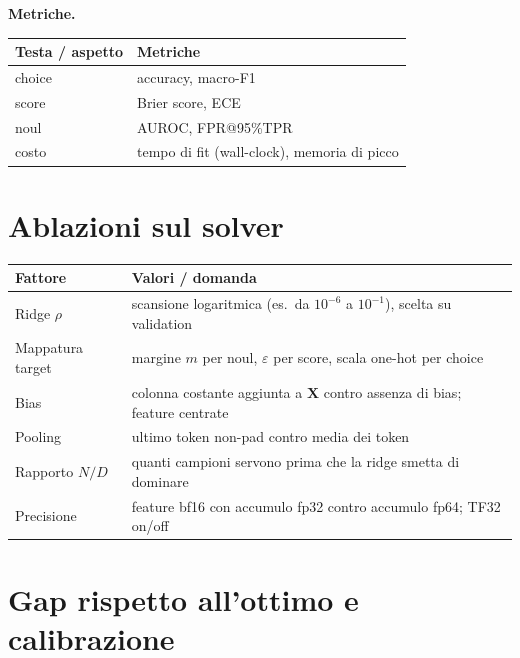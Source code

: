 \documentclass[11pt,a4paper]{article}
\newcommand{\X}{\bm{X}}
\begin{document}
\textbf{Metriche.}
\begin{center}
\begin{tabularx}{\textwidth}{lL}
\toprule
\textbf{Testa / aspetto} & \textbf{Metriche} \\
\midrule
choice & accuracy, macro-F1 \\
score  & Brier score, ECE \\
noul   & AUROC, FPR@95\%TPR \\
costo  & tempo di fit (wall-clock), memoria di picco \\
\bottomrule
\end{tabularx}
\end{center}

\section{Ablazioni sul solver}

\begin{center}
\begin{tabularx}{\textwidth}{lL}
\toprule
\textbf{Fattore} & \textbf{Valori / domanda} \\
\midrule
Ridge $\rho$ & scansione logaritmica (es.\ da $10^{-6}$ a $10^{-1}$), scelta su validation \\
Mappatura target & margine $m$ per noul, $\varepsilon$ per score, scala one-hot per choice \\
Bias & colonna costante aggiunta a $\X$ contro assenza di bias; feature centrate \\
Pooling & ultimo token non-pad contro media dei token \\
Rapporto $N/D$ & quanti campioni servono prima che la ridge smetta di dominare \\
Precisione & feature bf16 con accumulo fp32 contro accumulo fp64; TF32 on/off \\
\bottomrule
\end{tabularx}
\end{center}

\section{Gap rispetto all'ottimo e calibrazione}\label{sec:gap}
\end{document}
